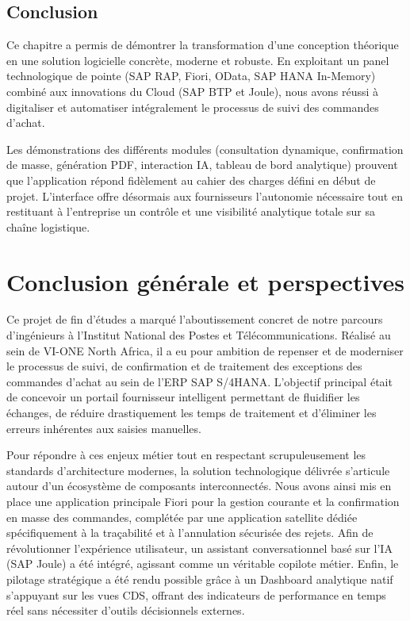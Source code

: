 \documentclass[12pt,a4paper,oneside]{report}
\begin{document}
\section{Conclusion}\label{ch5:conclusion}
Ce chapitre a permis de démontrer la transformation d'une conception théorique en une solution logicielle concrète, moderne et robuste. En exploitant un panel technologique de pointe (SAP RAP, Fiori, OData, SAP HANA In-Memory) combiné aux innovations du Cloud (SAP BTP et Joule), nous avons réussi à digitaliser et automatiser intégralement le processus de suivi des commandes d'achat.

Les démonstrations des différents modules (consultation dynamique, confirmation de masse, génération PDF, interaction IA, tableau de bord analytique) prouvent que l'application répond fidèlement au cahier des charges défini en début de projet. L'interface offre désormais aux fournisseurs l'autonomie nécessaire tout en restituant à l'entreprise un contrôle et une visibilité analytique totale sur sa chaîne logistique.


\chapter*{Conclusion g\'en\'erale et perspectives}
{}
\label{ch:conclusion}
Ce projet de fin d’études a marqué l’aboutissement concret de notre parcours d'ingénieurs à l’Institut National des Postes et Télécommunications. Réalisé au sein de VI-ONE North Africa, il a eu pour ambition de repenser et de moderniser le processus de suivi, de confirmation et de traitement des exceptions des commandes d'achat au sein de l'ERP SAP S/4HANA. L'objectif principal était de concevoir un portail fournisseur intelligent permettant de fluidifier les échanges, de réduire drastiquement les temps de traitement et d'éliminer les erreurs inhérentes aux saisies manuelles.

Pour répondre à ces enjeux métier tout en respectant scrupuleusement les standards d'architecture modernes, la solution technologique délivrée s'articule autour d'un écosystème de composants interconnectés. Nous avons ainsi mis en place une application principale Fiori pour la gestion courante et la confirmation en masse des commandes, complétée par une application satellite dédiée spécifiquement à la traçabilité et à l'annulation sécurisée des rejets. Afin de révolutionner l'expérience utilisateur, un assistant conversationnel basé sur l'IA (SAP Joule) a été intégré, agissant comme un véritable copilote métier. Enfin, le pilotage stratégique a été rendu possible grâce à un Dashboard analytique natif s'appuyant sur les vues CDS, offrant des indicateurs de performance en temps réel sans nécessiter d'outils décisionnels externes.
\end{document}
